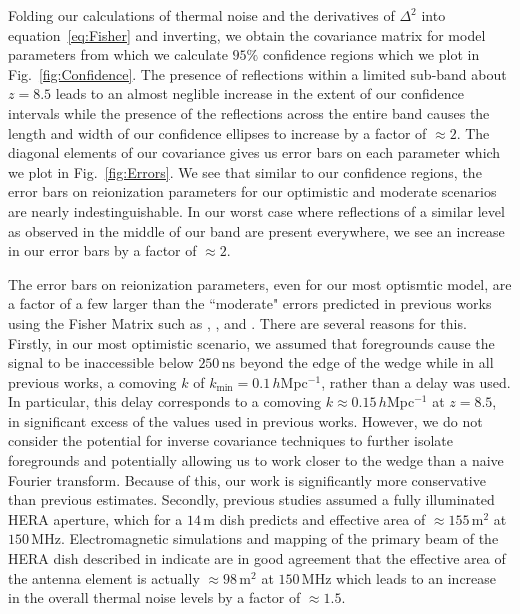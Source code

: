 \documentclass[twocolumn]{emulateapj}
\begin{document}
Folding our calculations of thermal noise and the derivatives of $\Delta^2$ into equation~\ref{eq:Fisher} and inverting, we obtain the covariance matrix for model parameters from which we calculate $95\%$ confidence regions which we plot in Fig.~\ref{fig:Confidence}. The presence of reflections within a limited sub-band about $z=8.5$ leads to an almost neglible increase in the extent of our confidence intervals while the presence of the reflections across the entire band causes the length and width of our confidence ellipses to increase by a factor of $\approx 2$. The diagonal elements of our covariance gives us error bars on each parameter which we plot in Fig.~\ref{fig:Errors}. We see that similar to our confidence regions, the error bars on reionization parameters for our optimistic and moderate scenarios are nearly indestinguishable. In our worst case where reflections of a similar level as observed in the middle of our band are present everywhere, we see an increase in our error bars by a factor of $\approx 2$. 

The error bars on reionization parameters, even for our most optismtic model, are a factor of a few larger than the ``moderate" errors predicted in previous works using the Fisher Matrix such as \citet{Pober:2014}, \citet{EwallWice:2015a}, and \citet{Liu:2015a,Liu:2015b}. There are several reasons for this. Firstly, in our most optimistic scenario, we assumed that foregrounds cause the signal to be inaccessible below $250$\,ns beyond the edge of the wedge while in all previous works, a comoving $k$ of $k_\text{min}=0.1$\,$h$Mpc$^{-1}$, rather than a delay was used. In particular, this delay corresponds to a comoving $k\approx0.15$\,$h$Mpc$^{-1}$ at $z=8.5$, in significant excess of the values used in previous works. However, we do not consider the potential for inverse covariance techniques to further isolate foregrounds and potentially allowing us to work closer to the wedge than a naive Fourier transform. Because of this, our work is significantly more conservative than previous estimates. Secondly, previous studies assumed a fully illuminated HERA aperture, which for a $14$\,m dish predicts and effective area of $\approx155$\,m$^2$ at $150$\,MHz. Electromagnetic simulations and mapping of the primary beam of the HERA dish described in \citep{Neben:2015c} indicate are in good agreement that the effective area of the antenna element is actually $\approx 98$\,m$^2$ at $150$\,MHz which leads to an increase in the overall thermal noise levels by a factor of $\approx 1.5$. 
\end{document}
